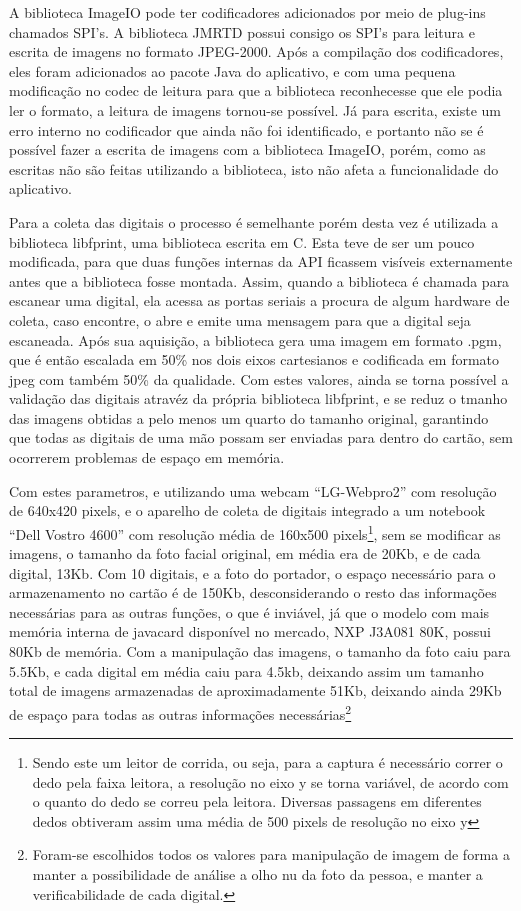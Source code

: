 \documentclass[11pt]{article}
\begin{document}
		A biblioteca ImageIO pode ter codificadores adicionados por meio de plug-ins chamados SPI's. A biblioteca JMRTD possui consigo os SPI's para leitura e escrita de imagens no formato JPEG-2000. Após a compilação dos codificadores, eles foram adicionados ao pacote Java do aplicativo, e com uma pequena modificação no codec de leitura para que a biblioteca reconhecesse que ele podia ler o formato, a leitura de imagens tornou-se possível. Já para escrita, existe um erro interno no codificador que ainda não foi identificado, e portanto não se é possível fazer a escrita de imagens com a biblioteca ImageIO, porém, como as escritas não são feitas utilizando a biblioteca, isto não afeta a funcionalidade do aplicativo. 
		 
		Para a coleta das digitais o processo é semelhante porém desta vez é utilizada a biblioteca libfprint, uma biblioteca escrita em C. Esta teve de ser um pouco modificada, para que duas funções internas da API ficassem visíveis externamente antes que a biblioteca fosse montada. Assim, quando a biblioteca é chamada para escanear uma digital, ela acessa as portas seriais a procura de algum hardware de coleta, caso encontre, o abre e emite uma mensagem para que a digital seja escaneada. Após sua aquisição, a biblioteca gera uma imagem em formato .pgm, que é então escalada em 50\% nos dois eixos cartesianos e codificada em formato jpeg com também 50\% da qualidade. Com estes valores, ainda se torna possível a validação das digitais atravéz da própria biblioteca libfprint, e se reduz o tmanho das imagens obtidas a pelo menos um quarto do tamanho original, garantindo que todas as digitais de uma mão possam ser enviadas para dentro do cartão, sem ocorrerem problemas de espaço em memória.
		
		Com estes parametros, e utilizando uma webcam ``LG-Webpro2'' com resolução de 640x420 pixels, e o aparelho de coleta de digitais integrado a um notebook ``Dell Vostro 4600'' com resolução média de 160x500 pixels\footnote{Sendo este um leitor de corrida, ou seja, para a captura é necessário correr o dedo pela faixa leitora, a resolução no eixo y se torna variável, de acordo com o quanto do dedo se correu pela leitora. Diversas passagens em diferentes dedos obtiveram assim uma média de 500 pixels de resolução no eixo y}, sem se modificar as imagens, o tamanho da foto facial original, em média era de 20Kb, e de cada digital, 13Kb. Com 10 digitais, e a foto do portador, o espaço necessário para o armazenamento no cartão é de 150Kb, desconsiderando o resto das informações necessárias para as outras funções, o que é inviável, já que o modelo com mais memória interna de javacard disponível no mercado, NXP J3A081 80K, possui 80Kb de memória. Com a manipulação das imagens, o tamanho da foto caiu para 5.5Kb, e cada digital em média caiu para 4.5kb, deixando assim um tamanho total de imagens armazenadas de aproximadamente 51Kb, deixando ainda 29Kb de espaço para todas as outras informações necessárias\footnote{Foram-se escolhidos todos os valores para manipulação de imagem de forma a manter a possibilidade de análise a olho nu da foto da pessoa, e manter a verificabilidade de cada digital.}
		
\end{document}
